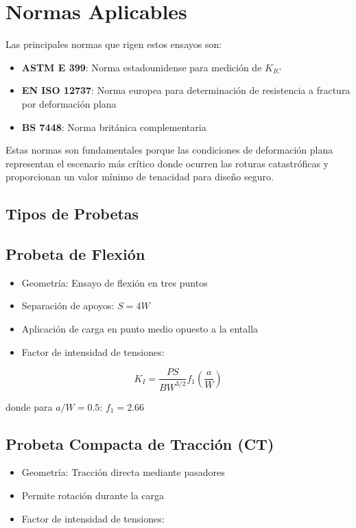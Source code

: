\documentclass[12pt,letterpaper]{article}
\begin{document}
\section{Normas Aplicables}

Las principales normas que rigen estos ensayos son:
\begin{itemize}
\item \textbf{ASTM E 399}: Norma estadounidense para medición de $K_{IC}$
\item \textbf{EN ISO 12737}: Norma europea para determinación de resistencia a fractura por deformación plana
\item \textbf{BS 7448}: Norma británica complementaria
\end{itemize}

Estas normas son fundamentales porque las condiciones de deformación plana representan el escenario más crítico donde ocurren las roturas catastróficas y proporcionan un valor mínimo de tenacidad para diseño seguro.

\subsection{Tipos de Probetas}

\subsection{Probeta de Flexión}
\begin{itemize}
\item Geometría: Ensayo de flexión en tres puntos
\item Separación de apoyos: $S = 4W$
\item Aplicación de carga en punto medio opuesto a la entalla
\item Factor de intensidad de tensiones:
\end{itemize}

\[K_I = \frac{PS}{BW^{3/2}} f_1\left(\frac{a}{W}\right)\]

donde para $a/W = 0.5$: $f_1 = 2.66$

\subsection{Probeta Compacta de Tracción (CT)}
\begin{itemize}
\item Geometría: Tracción directa mediante pasadores
\item Permite rotación durante la carga
\item Factor de intensidad de tensiones:
\end{itemize}
\end{document}
